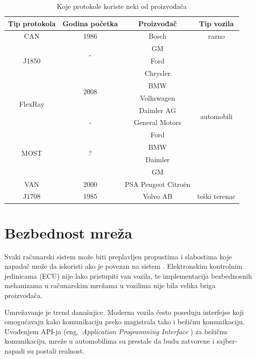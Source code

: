 \documentclass[a4paper]{article}
\begin{document}
\begin{table}[h!]
\begin{center}
  
\begin{tabular}{ c|c|c|c }
\textbf{Tip protokola} & \textbf{Godina početka} & \textbf{Proizvođač} & \textbf{Tip vozila}\\
\hline
CAN & 1986 & Bosch & razno\\ \hline
\multirow{3}{*}{J1850} & \multirow{2}{*}{-} &  GM & \multirow{12}{*}{automobili} \\
	  & & Ford & \\ \cline{2-3}
             & \multirow{4}{*}{2008} & Chrysler &  \\ \cline{1-1} \cline{3-3}
\multirow{4}{*}{FlexRay}  &    & BMW &  \\
	 		 	 &    & Volkswagen &\\
				 &    & Daimler AG &\\   \cline{2-3}
				 &  - & General Motors &\\ \cline{1-3}
\multirow{4}{*}{MOST} & \multirow{4}{*}{?} & Ford  & \\ 
 &  & BMW & \\ 
 &  & Daimler& \\
 &  &  GM & \\ \cline{1-3}
VAN & 2000 & PSA Peugeot Citroën & \\ \hline
J1708 & 1985 & Volvo AB & teški terenac \\ \hline


\end{tabular}
\caption{Koje protokole koriste neki od proizvođača}
\label{table:tabela1}
\end{center}
\end{table}



\section{Bezbednost mreža}
\label{sec:izazovi}

Svaki računarski sistem može biti preplavljen propustima i slabostima koje napadač može da iskoristi ako je povezan na sistem \cite{6615528}. Elektronskim kontrolnim jedinicama (ECU) nije lako pristupiti van vozila, te implementacija bezbednosnih mehanizama u računarskim mrežama u vozilima nije bila velika briga proizvođača.

Umrežavanje je trend današnjice. Moderna vozila često poseduju interfejse koji omogućavaju kako komunikaciju preko magistrala tako i bežičnu komunikaciju. Uvođenjem API-ja (eng.~{\em Application Programming Interface} \cite{API}) za bežičnu komunikaciju, mreže u automobilima su prestale da budu zatvorene i sajber-napadi su postali realnost.
\end{document}

